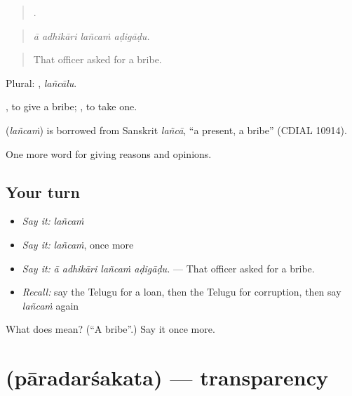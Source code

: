 \begin{quote}
   .
\end{quote}

\begin{quote}
\emph{ā adhikāri lañcaṁ aḍigāḍu.}
\end{quote}

\begin{quote}
That officer asked for a bribe.
\end{quote}

Plural: , \emph{lañcālu}.

 , to give a bribe;  , to take one.

\begin{cousinweb}
\textbf{} (\emph{lañcaṁ}) is borrowed from Sanskrit \emph{lañcā}, \textquotedblleft{}a present, a bribe\textquotedblright{} (CDIAL 10914).
\end{cousinweb}

\begin{grammarlens}[title={What you've built}]
One more word for giving reasons and opinions.
\end{grammarlens}

\subsection*{Your turn}
\begin{itemize}
\raggedright
  \item \emph{Say it:} \emph{lañcaṁ}
  \item \emph{Say it:} \emph{lañcaṁ}, once more
  \item \emph{Say it:} \emph{ā adhikāri lañcaṁ aḍigāḍu.} — That officer asked for a bribe.
  \item \emph{Recall:} say the Telugu for a loan, then the Telugu for corruption, then say \emph{lañcaṁ} again
\end{itemize}

\begin{tcolorbox}[breakable,colback=teal!4,colframe=teal!35!black,title={Before you move on}]
What does  mean? (\textquotedblleft{}A bribe\textquotedblright{}.) Say it once more.
\end{tcolorbox}
\section[\texorpdfstring{\te{పారదర్శకత} (pāradarśakata)}{పారదర్శకత (pāradarśakata)}]{ (pāradarśakata) — transparency}

